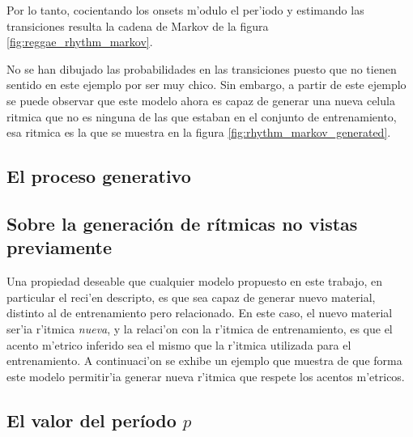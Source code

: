 Por lo tanto, cocientando los onsets m'odulo el per'iodo y estimando las transiciones resulta la cadena de Markov de la figura \ref{fig:reggae_rhythm_markov}.

\begin{imagen}
    \width{15cm}
\end{imagen}

No se han dibujado las probabilidades en las transiciones puesto que no tienen sentido en este ejemplo por ser muy chico. Sin embargo, a partir de este ejemplo se 
puede observar que este modelo ahora es capaz de generar una nueva celula ritmica que no es ninguna de las que estaban en el conjunto de entrenamiento, esa
ritmica es la que se muestra en la figura \ref{fig:rhythm_markov_generated}.

\begin{imagen}
    \width{15cm}
\end{imagen}

\subsection{El proceso generativo}

\subsection{Sobre la generaci\'on de r\'itmicas no vistas previamente}
Una propiedad deseable que cualquier modelo propuesto en este trabajo, en particular el reci'en descripto, es que sea capaz de generar nuevo material, distinto al de entrenamiento
pero relacionado. En este caso, el nuevo material ser'ia r'itmica \emph{nueva}, y la relaci'on con la r'itmica de entrenamiento, es que el acento m'etrico inferido sea el mismo
que la r'itmica utilizada para el entrenamiento. A continuaci'on se exhibe un ejemplo que muestra de que forma este modelo permitir'ia generar nueva r'itmica que respete 
los acentos m'etricos.


\subsection{El valor del per\'iodo $p$}

